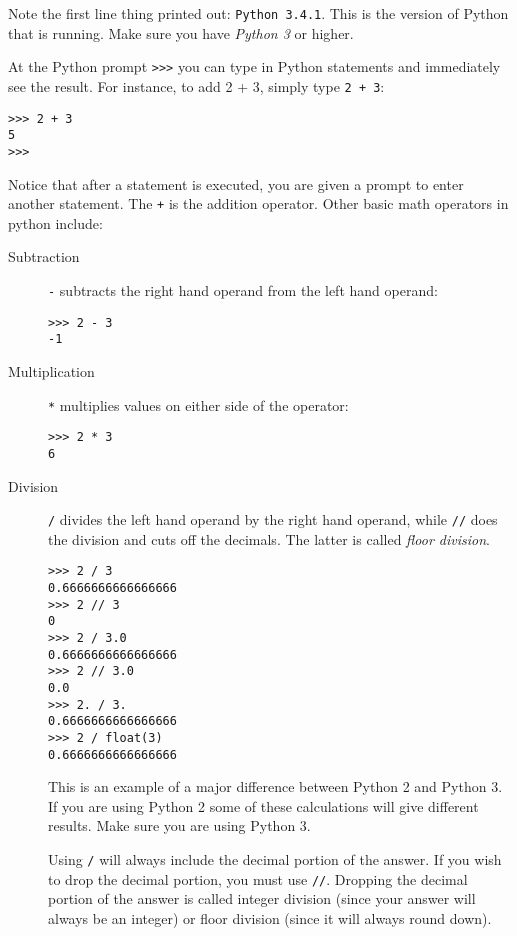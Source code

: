 \documentclass[11pt]{cselabheader}
\begin{document}
Note the first line thing printed out: \texttt{Python 3.4.1}. This is the
version of Python that is running. Make sure you have \emph{Python 3} or higher.

At the Python prompt \texttt{>>>} you can type in Python statements and
immediately see the result. For instance, to add 2 + 3, simply type \texttt{2 +
3}: 
\begin{lstlisting}[style=bash]
>>> 2 + 3
5
>>>
\end{lstlisting}

Notice that after a statement is executed, you are given a prompt to enter
another statement. The \texttt{+} is the addition operator. Other basic math
operators in python include:

\begin{description}
  \item[Subtraction] \texttt{-} subtracts the right hand operand from the left
    hand operand:
    \begin{lstlisting}[style=bash]
>>> 2 - 3
-1
    \end{lstlisting}

  \item[Multiplication] \texttt{*} multiplies values on either side of the
    operator:

    \begin{lstlisting}[style=bash]
>>> 2 * 3
6
    \end{lstlisting}

  \item[Division] \texttt{/} divides the left hand operand by the right hand
    operand, while \texttt{//} does the division and cuts off the decimals. The
    latter is called \emph{floor division}.

  \begin{lstlisting}[style=bash]
>>> 2 / 3
0.6666666666666666
>>> 2 // 3
0
>>> 2 / 3.0
0.6666666666666666
>>> 2 // 3.0
0.0
>>> 2. / 3.
0.6666666666666666
>>> 2 / float(3)
0.6666666666666666
  \end{lstlisting}

    This is an example of a major difference between Python 2 and Python 3. If
    you are using Python 2 some of these calculations will give different
    results. Make sure you are using Python 3.

    Using \texttt{/} will always include the decimal portion of the answer. If
    you wish to drop the decimal portion, you must use \texttt{//}. Dropping the
    decimal portion of the answer is called integer division (since your answer
    will always be an integer) or floor division (since it will always round
    down).


\end{description}
\end{document}
